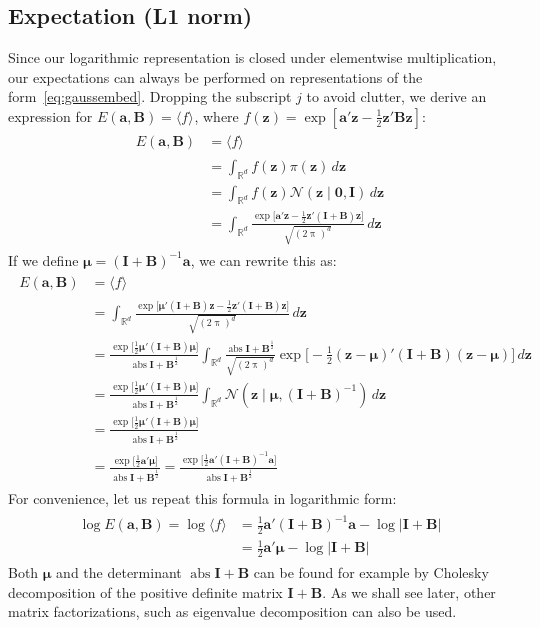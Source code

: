 \documentclass[a4paper,oneside,12pt,english]{report}
\def\zvec{\mathbf{z}}
\def\ND{\mathcal{N}}
\DeclareMathOperator{\abs}{abs}
\def\expv#1#2{\bigl\langle#1\bigr\rangle_{#2}}
\def\expp#1{\bigl\langle#1\bigr\rangle}
\def\R{\mathbb{R}}
\def\detm#1{\lvert#1\rvert}
\def\Bmat{\mathbf{B}}
\def\Imat{\mathbf{I}}
\def\muvec{\boldsymbol{\mu}}
\def\avec{\mathbf{a}}
\def\nulvec{\boldsymbol{0}}
\def\logdet#1{\log\detm{#1}}
\begin{document}
\subsection{Expectation (L1 norm)}
Since our logarithmic representation is closed under elementwise multiplication, our expectations can always be performed on representations of the form~\eqref{eq:gaussembed}. Dropping the subscript $j$ to avoid clutter, we derive an expression for $E(\avec,\Bmat)=\expv{f}{}$, where $f(\zvec)=\exp[\avec'\zvec-\frac12\zvec'\Bmat\zvec]$:
\begin{align}
\label{eq:MVGproblem}
\begin{split}
E(\avec,\Bmat) &= \expv{f}{} \\
&= \int_{\R^d} f(\zvec)\pi(\zvec) \,d\zvec \\
&= \int_{\R^d} f(\zvec)\ND(\zvec\mid\nulvec,\Imat) \,d\zvec \\
&= \int_{\R^d} \frac{\exp\bigl[\avec'\zvec -\frac12\zvec'(\Imat+\Bmat)\zvec\bigr]}{\sqrt{(2\uppi)^d}} \,d\zvec 
\end{split}
\end{align}
If we define $\muvec=(\Imat+\Bmat)^{-1}\avec$, we can rewrite this as:
\begin{align}
\label{eq:exactMVG}
\begin{split}
E(\avec,\Bmat) &= \expv{f}{} \\
&= \int_{\R^d} \frac{\exp\bigl[\muvec'(\Imat+\Bmat)\zvec -\frac12\zvec'(\Imat+\Bmat)\zvec\bigr]}{\sqrt{(2\uppi)^d}} \,d\zvec \\
&= \frac{\exp\bigl[\frac12\muvec'(\Imat+\Bmat)\muvec\bigr]}{\abs{\Imat+\Bmat}^{\frac12}}
\int_{\R^d} \frac{\abs{\Imat+\Bmat}^\frac12}{\sqrt{(2\uppi)^d}} \exp\bigl[-\frac12(\zvec-\muvec)'(\Imat+\Bmat)(\zvec-\muvec)\bigr]\,d\zvec \\
&= \frac{\exp\bigl[\frac12\muvec'(\Imat+\Bmat)\muvec\bigr]}{\abs{\Imat+\Bmat}^{\frac12}} \int_{\R^d} \ND(\zvec\mid\muvec,(\Imat+\Bmat)^{-1}) \,d\zvec \\
&= \frac{\exp\bigl[\frac12\muvec'(\Imat+\Bmat)\muvec\bigr]}{\abs{\Imat+\Bmat}^{\frac12}} \\
&= \frac{\exp\bigl[\frac12\avec'\muvec\bigr]}{\abs{\Imat+\Bmat}^{\frac12}} 
= \frac{\exp\bigl[\frac12\avec'(\Imat+\Bmat)^{-1}\avec\bigr]}{\abs{\Imat+\Bmat}^{\frac12}} 
\end{split}
\end{align}
For convenience, let us repeat this formula in logarithmic form:
\begin{align}
\label{eq:GMElogex}
\begin{split}
\log E(\avec,\Bmat) = \log\expp{f} 
&= \frac12\avec'(\Imat+\Bmat)^{-1}\avec - \logdet{\Imat+\Bmat} \\
&= \frac12\avec'\muvec - \logdet{\Imat+\Bmat}
\end{split}
\end{align}
Both $\muvec$ and the determinant $\abs{\Imat+\Bmat}$ can be found for example by Cholesky decomposition of the positive definite matrix $\Imat+\Bmat$. As we shall see later, other matrix factorizations, such as eigenvalue decomposition can also be used.  
\end{document}
